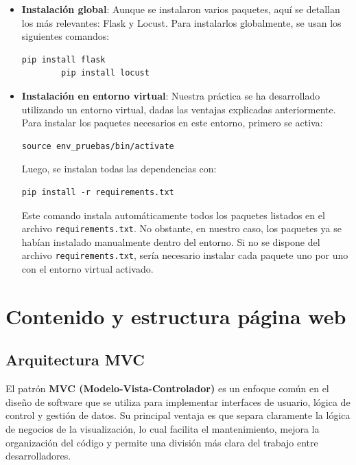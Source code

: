 \documentclass[10pt]{book}
\begin{document}
    \begin{itemize}
        \item \textbf{Instalación global}: Aunque se instalaron varios paquetes, aquí se detallan los más relevantes: Flask y Locust. Para instalarlos globalmente, se usan los siguientes comandos:
    
        \begin{lstlisting}[style=simplebash]
        pip install flask
        pip install locust
        \end{lstlisting}
    
        \item \textbf{Instalación en entorno virtual}: Nuestra práctica se ha desarrollado utilizando un entorno virtual, dadas las ventajas explicadas anteriormente. Para instalar los paquetes necesarios en este entorno, primero se activa:
    
        \begin{lstlisting}[style=simplebash]
        source env_pruebas/bin/activate
        \end{lstlisting}
    
        Luego, se instalan todas las dependencias con:
    
        \begin{lstlisting}[style=simplebash]
        pip install -r requirements.txt
        \end{lstlisting}
    
        Este comando instala automáticamente todos los paquetes listados en el archivo \texttt{requirements.txt}. No obstante, en nuestro caso, los paquetes ya se habían instalado manualmente dentro del entorno. Si no se dispone del archivo \texttt{requirements.txt}, sería necesario instalar cada paquete uno por uno con el entorno virtual activado.
    \end{itemize}


\section{Contenido y estructura página web} 
\subsection{Arquitectura MVC} 

\cite{mdn_mvc}El patrón \textbf{MVC (Modelo-Vista-Controlador)} es un enfoque común en el diseño de software que se utiliza para implementar interfaces de usuario, lógica de control y gestión de datos. Su principal ventaja es que separa claramente la lógica de negocios de la visualización, lo cual facilita el mantenimiento, mejora la organización del código y permite una división más clara del trabajo entre desarrolladores.
\end{document}
